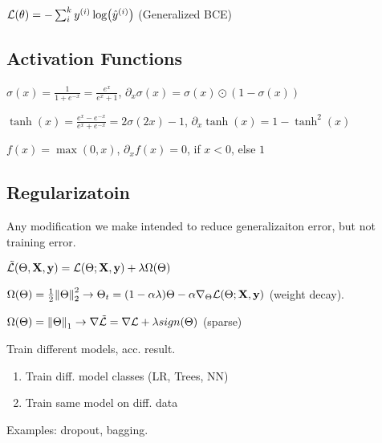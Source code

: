 \begin{definition}
    \(\mathcal{L}(\theta) = - \sum_i^k y^{(i)} \log (\hat y^{(i)})\) (Generalized BCE)
\end{definition}

\subsection{Activation Functions}

\begin{definition}[Sigmoid]
    \(\sigma(x) = \frac{1}{1 + e^{-x}} = \frac{e^x}{e^x + 1}\), \(\partial_x \sigma(x) = \sigma(x) \odot (1 - \sigma(x))\)
\end{definition}

\begin{definition}[Tanh]
    \(\tanh(x) = \frac{e^x - e^{-x}}{e^x + e^{-x}} = 2\sigma(2x) - 1\), \(\partial_x \tanh(x) = 1 - \tanh^2(x)\)
\end{definition}

\begin{definition}[Relu]
    \(f(x) = \max(0, x)\), \(\partial_x f(x) = 0\), if \(x < 0\), else \(1\)
\end{definition}

\subsection{Regularizatoin}
Any modification we make intended to reduce generalizaiton error, but not training error.
\begin{center}
    \(\tilde {\mathcal{L}}(\Theta, \vb{X}, \vb{y}) = \mathcal{L}(\Theta; \vb{X}, \vb{y}) + \lambda \Omega(\Theta)\)
\end{center}

\begin{definition}[Ridge]
    \(\Omega(\Theta) = \frac{1}{2} \norm{\Theta}_2^2 \to \Theta_t = (1 - \alpha \lambda)\Theta - \alpha \nabla_\Theta \mathcal{L}(\Theta; \vb{X}, \vb{y})\) (weight decay).
\end{definition}

\begin{definition}[Lasso]
    \(\Omega(\Theta) = \norm{\Theta}_1 \to \nabla \tilde {\mathcal{L}} = \nabla \mathcal{L} + \lambda sign(\Theta)\) (sparse)
\end{definition}

\begin{definition}
    Train different models, acc. result.
    \begin{enumerate}
        \item Train diff. model classes (LR, Trees, NN)
        \item Train same model on diff. data
    \end{enumerate}
    Examples: dropout, bagging.
\end{definition}

